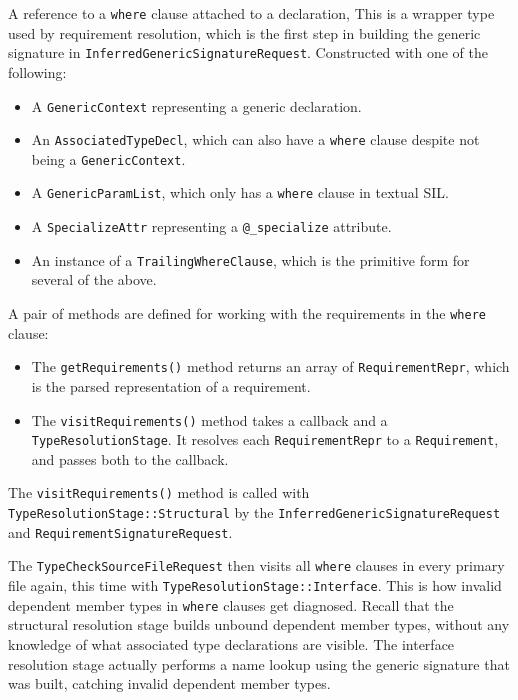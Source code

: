 \documentclass[../generics]{subfiles}
\begin{document}
A reference to a \texttt{where} clause attached to a declaration, This is a wrapper type used by requirement resolution, which is the first step in building the generic signature in \texttt{InferredGenericSignatureRequest}. Constructed with one of the following:
\begin{itemize}
\item A \texttt{GenericContext} representing a generic declaration.
\item An \texttt{AssociatedTypeDecl}, which can also have a \texttt{where} clause despite not being a \texttt{GenericContext}.
\item A \texttt{GenericParamList}, which only has a \texttt{where} clause in textual SIL.
\item A \texttt{SpecializeAttr} representing a \texttt{@\_specialize} attribute.
\item An instance of a \texttt{TrailingWhereClause}, which is the primitive form for several of the above.
\end{itemize}
A pair of methods are defined for working with the requirements in the \texttt{where} clause:
\begin{itemize}
\item The \texttt{getRequirements()} method returns an array of \texttt{RequirementRepr}, which is the parsed representation of a requirement.
\item The \texttt{visitRequirements()} method takes a callback and a \texttt{TypeResolutionStage}. It resolves each \texttt{RequirementRepr} to a \texttt{Requirement}, and passes both to the callback.
\end{itemize}
The \texttt{visitRequirements()} method is called with \texttt{TypeResolutionStage::Structural} by the \texttt{InferredGenericSignatureRequest} and \texttt{RequirementSignatureRequest}.

The \texttt{TypeCheckSourceFileRequest} then visits all \texttt{where} clauses in every primary file again, this time with \texttt{TypeResolutionStage::Interface}. This is how invalid dependent member types in \texttt{where} clauses get diagnosed. Recall that the structural resolution stage builds unbound dependent member types, without any knowledge of what associated type declarations are visible. The interface resolution stage actually performs a name lookup using the generic signature that was built, catching invalid dependent member types.
\end{document}
